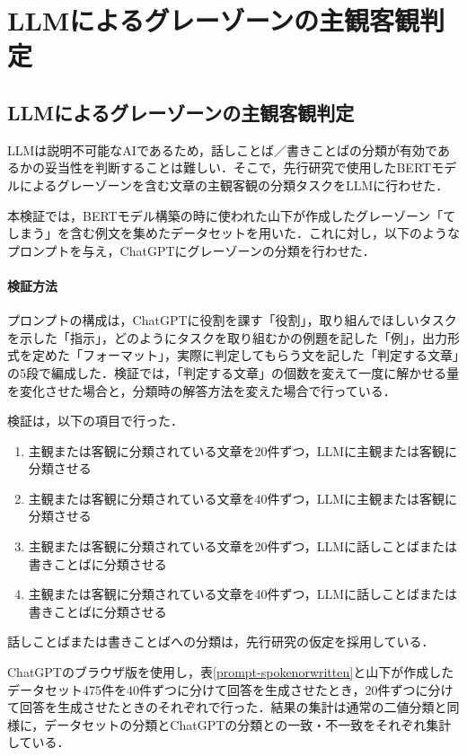 \chapter{LLMによるグレーゾーンの主観客観判定 \label{c5}}

\section{LLMによるグレーゾーンの主観客観判定 \label{c5s2}}
LLMは説明不可能なAIであるため，話しことば／書きことばの分類が有効であるかの妥当性を判断することは難しい．そこで，先行研究で使用したBERTモデルによるグレーゾーンを含む文章の主観客観の分類タスクをLLMに行わせた．

本検証では，BERTモデル構築の時に使われた山下が作成したグレーゾーン「てしまう」を含む例文を集めたデータセットを用いた．これに対し，以下のようなプロンプトを与え，ChatGPTにグレーゾーンの分類を行わせた．



\subsubsection{検証方法}

プロンプトの構成は，ChatGPTに役割を課す「役割」，取り組んでほしいタスクを示した「指示」，どのようにタスクを取り組むかの例題を記した「例」，出力形式を定めた「フォーマット」，実際に判定してもらう文を記した「判定する文章」の5段で編成した．検証では，「判定する文章」の個数を変えて一度に解かせる量を変化させた場合と，分類時の解答方法を変えた場合で行っている．


検証は，以下の項目で行った．
\begin{enumerate}
    \item 主観または客観に分類されている文章を20件ずつ，LLMに主観または客観に分類させる
    \item 主観または客観に分類されている文章を40件ずつ，LLMに主観または客観に分類させる
    \item 主観または客観に分類されている文章を20件ずつ，LLMに話しことばまたは書きことばに分類させる
    \item 主観または客観に分類されている文章を40件ずつ，LLMに話しことばまたは書きことばに分類させる
\end{enumerate}
話しことばまたは書きことばへの分類は，先行研究\cite{checker}の仮定を採用している．

ChatGPTのブラウザ版を使用し，表\ref{prompt-spokenorwritten}と山下が作成したデータセット475件を40件ずつに分けて回答を生成させたとき，20件ずつに分けて回答を生成させたときのそれぞれで行った．結果の集計は通常の二値分類と同様に，データセットの分類とChatGPTの分類との一致・不一致をそれぞれ集計している．

